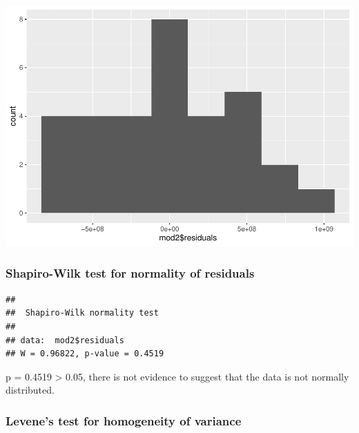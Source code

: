 \documentclass[
]{article}
\newenvironment{Shaded}{\begin{snugshade}}{\end{snugshade}}
\newcommand{\AttributeTok}[1]{\textcolor[rgb]{0.13,0.29,0.53}{#1}}
\newcommand{\FunctionTok}[1]{\textcolor[rgb]{0.13,0.29,0.53}{\textbf{#1}}}
\newcommand{\NormalTok}[1]{#1}
\newcommand{\SpecialCharTok}[1]{\textcolor[rgb]{0.81,0.36,0.00}{\textbf{#1}}}
\begin{document}
\begin{Shaded}
\end{Shaded}

\includegraphics{analysis_files/figure-latex/residuals-group3-1.pdf}

\subsubsection{Shapiro-Wilk test for normality of
residuals}\label{shapiro-wilk-test-for-normality-of-residuals-1}

\begin{Shaded}
\end{Shaded}

\begin{verbatim}
## 
##  Shapiro-Wilk normality test
## 
## data:  mod2$residuals
## W = 0.96822, p-value = 0.4519
\end{verbatim}

p = 0.4519 \textgreater{} 0.05, there is not evidence to suggest that
the data is not normally distributed.

\subsubsection{Levene's test for homogeneity of
variance}\label{levenes-test-for-homogeneity-of-variance-1}
\end{document}
